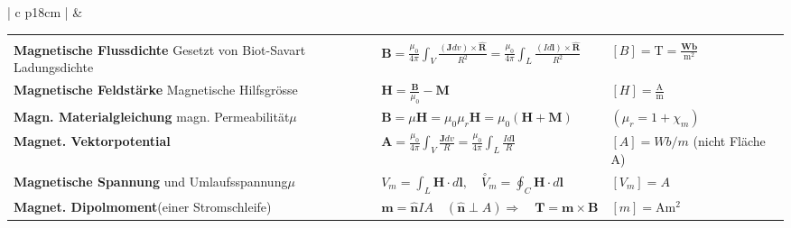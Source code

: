 	\begin{tabular}{ | c   p{18cm} |}
		\hline
		\rotcell{\large\textbf{\textcolor{white}{Magnetostatik}}}  &
		\setlength{\extrarowheight}{10pt}	
		
		\begin{tabular}{L{5cm} L{6.5cm} L{5.3cm}}
			&&\\[-20pt]
			
			
			\textbf{Magnetische Flussdichte} \qquad\qquad\qquad Gesetzt von Biot-Savart Ladungsdichte&$\displaystyle \mathbf{B}=\frac{\mu_{0}}{4 \pi} \int_{V} \frac{(\mathbf{J} d v) \times \hat{\mathbf{R}}}{R^{2}}=\frac{\mu_{0}}{4 \pi} \int_{L} \frac{(I d \mathbf{l}) \times \hat{\mathbf{R}}}{R^{2}} $&$\displaystyle [B]=\mathrm{T}=\frac{\mathbf{W b}}{\mathrm{m}^{2}}$\\[5pt]
			
			
			\textbf{Magnetische Feldstärke} \qquad\qquad Magnetische Hilfsgrösse&$\displaystyle \mathbf{H}=\frac{\mathbf{B}}{\mu_{0}}-\mathbf{M} $&$\displaystyle \left[H\right]=\frac{\mathrm{A}}{\mathrm{m}}$\\[5pt]
	
			\textbf{Magn. Materialgleichung} \qquad\qquad\qquad magn. Permeabilität$\mu$&
			$\displaystyle \mathbf{B}=\mu \mathbf{H}=\mu_{0} \mu_{r} \mathbf{H}=\mu_{0}(\mathbf{H}+\mathbf{M}) $&$\displaystyle \left(\mu_{r}=1+\chi_{m}\right)$\\[5pt]
			
			\textbf{ Magnet. Vektorpotential} &$\displaystyle \mathbf{A}=\frac{\mu_{0}}{4 \pi} \int_{V} \frac{\mathbf{J} d v}{R}=\frac{\mu_{0}}{4 \pi} \int_{L} \frac{I d \mathbf{l}}{R}$&$\left[ A\right ]= Wb/m$ (nicht Fläche A)\\[5pt]
			
			\textbf{Magnetische Spannung} \qquad\qquad\qquad und Umlaufsspannung$\mu$&
			$\displaystyle V_{m}=\int_{L} \mathbf{H} \cdot d \mathbf{l}, \quad \stackrel{\circ}{V}_{m}=\oint_{C} \mathbf{H} \cdot d \mathbf{l}$
			& $\displaystyle \left[V_m\right]=A$\\[5pt]
			
			
			\textbf{Magnet. Dipolmoment}\qquad\qquad (einer Stromschleife) &$\displaystyle \mathbf{m}=\hat{\mathbf{n}} I A \quad(\hat{\mathbf{n}} \perp A)  \Rightarrow \quad \mathbf{T}=\mathbf{m} \times \mathbf{B} $&$[m]=\mathrm{A} \mathrm{m}^{2}$\\[5pt]
			

\end{tabular}
\end{tabular}
